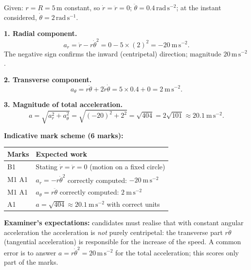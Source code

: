 \documentclass[11pt]{article}
\begin{document}
\begin{corrige}
Given: $r = R = 5\,\mathrm{m}$ constant, so $\dot{r} = \ddot{r} = 0$; $\ddot{\theta} = 0.4\,\mathrm{rad\,s^{-2}}$; at the instant considered, $\dot{\theta} = 2\,\mathrm{rad\,s^{-1}}$.

\textbf{1. Radial component.}
\[ a_r = \ddot{r} - r\dot{\theta}^2 = 0 - 5 \times (2)^2 = -20\ \mathrm{m\,s^{-2}}. \]
The negative sign confirms the inward (centripetal) direction; magnitude $20\,\mathrm{m\,s^{-2}}$.

\textbf{2. Transverse component.}
\[ a_\theta = r\ddot{\theta} + 2\dot{r}\dot{\theta} = 5 \times 0.4 + 0 = 2\ \mathrm{m\,s^{-2}}. \]

\textbf{3. Magnitude of total acceleration.}
\[ a = \sqrt{a_r^2 + a_\theta^2} = \sqrt{(-20)^2 + 2^2} = \sqrt{404} = 2\sqrt{101} \approx 20.1\ \mathrm{m\,s^{-2}}. \]

\textbf{Indicative mark scheme (6 marks):}
\begin{center}
\begin{tabularx}{\linewidth}{|l|X|}
\hline
\rowcolor{popblueL} \textbf{Marks} & \textbf{Expected work} \\
\hline
B1 & Stating $\dot r = \ddot r = 0$ (motion on a fixed circle) \\
\hline
M1 A1 & $a_r = -r\dot\theta^2$ correctly computed: $-20\ \mathrm{m\,s^{-2}}$ \\
\hline
M1 A1 & $a_\theta = r\ddot\theta$ correctly computed: $2\ \mathrm{m\,s^{-2}}$ \\
\hline
A1 & $a = \sqrt{404} \approx 20.1\ \mathrm{m\,s^{-2}}$ with correct units \\
\hline
\end{tabularx}
\end{center}

\textbf{Examiner's expectations:} candidates must realise that with constant angular acceleration the acceleration is \emph{not} purely centripetal: the transverse part $r\ddot\theta$ (tangential acceleration) is responsible for the increase of the speed. A common error is to answer $a = r\dot\theta^2 = 20\,\mathrm{m\,s^{-2}}$ for the total acceleration; this scores only part of the marks.
\end{corrige}
\end{document}
